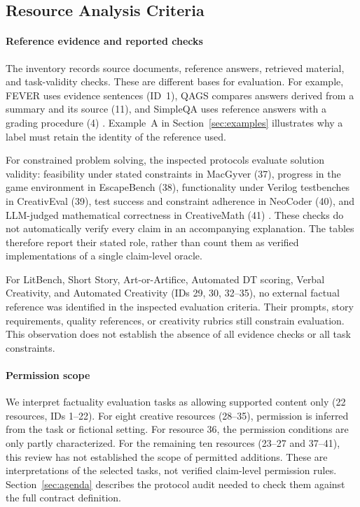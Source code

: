 \documentclass{clv2025}
\begin{document}
\subsection{Resource Analysis Criteria}\label{sec:mapping}

\paragraph{Reference evidence and reported checks}
The inventory records source documents, reference answers, retrieved
material, and task-validity checks. These are different bases for evaluation.
For example, FEVER uses evidence sentences (ID~1), QAGS compares answers
derived from a summary and its source (11), and SimpleQA uses reference
answers with a grading procedure (4)
\citep{thorne_fever_2018,wang_asking_2020,wei_measuring_2024}.
Example~A in Section~\ref{sec:examples} illustrates why a label must retain the
identity of the reference used.

For constrained problem solving, the inspected protocols evaluate solution
validity: feasibility under stated constraints in MacGyver (37), progress
in the game environment in EscapeBench (38), functionality under Verilog
testbenches in CreativEval (39), test success and constraint adherence in
NeoCoder (40), and LLM-judged mathematical correctness in CreativeMath (41)
\citep{tian_macgyver_2025,qian_escapebench_2025,delorenzo_creativeval_2024,
lu_benchmarking_2025,ye_assessing_2025}. These checks do not automatically
verify every claim in an accompanying explanation. The tables therefore
report their stated role, rather than count them as verified implementations
of a single claim-level oracle.

For LitBench, Short Story, Art-or-Artifice, Automated DT scoring, Verbal
Creativity, and Automated Creativity (IDs 29, 30, 32--35), no external
factual reference was identified in the inspected evaluation criteria.
Their prompts, story requirements, quality references, or creativity
rubrics still constrain evaluation. This observation does not establish
the absence of all evidence checks or all task constraints.

\paragraph{Permission scope}
We interpret factuality evaluation tasks as allowing supported content
only (22 resources, IDs 1--22). For eight creative resources (28--35),
permission is inferred from the task or fictional setting. For resource 36,
the permission conditions are only partly characterized. For the remaining
ten resources (23--27 and 37--41), this review has not established the scope
of permitted additions. These are interpretations of the selected tasks,
not verified claim-level permission rules. Section~\ref{sec:agenda}
describes the protocol audit needed to check them against the full
contract definition.
\end{document}
